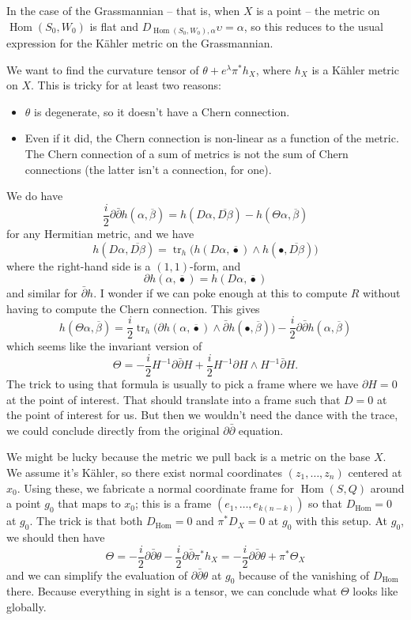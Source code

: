 \documentclass[10pt,a4paper]{article}
\def\ov#1{\overline{#1}}
\DeclareMathOperator{\Hom}{Hom}
\DeclareMathOperator{\tr}{tr}
\begin{document}
In the case of the Grassmannian -- that is, when $X$ is a point -- the metric on $\Hom(S_0,W_0)$ is flat and $D_{\Hom(S_0,W_0),\alpha}\upsilon = \alpha$, so this reduces to the usual expression for the K\"ahler metric on the Grassmannian.

We want to find the curvature tensor of $\theta + e^\lambda \pi^* h_X$, where $h_X$ is a K\"ahler metric on $X$. This is tricky for at least two reasons:
\begin{itemize}
\item $\theta$ is degenerate, so it doesn't have a Chern connection.
\item Even if it did, the Chern connection is non-linear as a function of the metric. The Chern connection of a sum of metrics is not the sum of Chern connections (the latter isn't a connection, for one).
\end{itemize}
We do have
\[
\frac i2 \partial \bar \partial h(\alpha,\ov\beta)
= h(D\alpha, \ov{D\beta}) - h(\Theta \alpha, \ov\beta)
\]
for any Hermitian metric, and we have
\[
h(D\alpha, \ov{D\beta})
= \tr_h \bigl(
h(D\alpha, \ov{\bullet})
\wedge
h(\bullet, \ov{D\beta})
\bigr)
\]
where the right-hand side is a $(1,1)$-form, and
\[
\partial h(\alpha, \ov\bullet)
= h(D\alpha, \ov\bullet)
\]
and similar for $\bar\partial h$. I wonder if we can poke enough at this to compute $R$ without having to compute the Chern connection. This gives
\[
h(\Theta \alpha, \ov\beta)
= \frac i2 \tr_h \big(
\partial h(\alpha, \ov\bullet)
\wedge
\bar\partial h(\bullet, \ov\beta)
\bigr)
- \frac i2 \partial\bar\partial h(\alpha,\ov\beta)
\]
which seems like the invariant version of
\[
\Theta
= - \frac i2 H^{-1} \partial \bar \partial H
+ \frac i2 H^{-1}\partial H \wedge H^{-1} \bar\partial  H.
\]
The trick to using that formula is usually to pick a frame where we have $\partial H = 0$ at the point of interest. That should translate into a frame such that $D = 0$ at the point of interest for us. But then we wouldn't need the dance with the trace, we could conclude directly from the original $\partial\bar\partial$ equation.

We might be lucky because the metric we pull back is a metric on the base $X$. We assume it's K\"ahler, so there exist normal coordinates $(z_1, \ldots, z_n)$ centered at $x_0$. Using these, we fabricate a normal coordinate frame for $\Hom(S,Q)$ around a point $g_0$ that maps to $x_0$; this is a frame $(e_1, \ldots, e_{k(n-k)})$ so that $D_{\Hom} = 0$ at $g_0$. The trick is that both $D_{\Hom} = 0$ and $\pi^*D_X = 0$ at $g_0$ with this setup. At $g_0$, we should then have
\[
\Theta =
-\frac i2 \partial \bar \partial \theta
-\frac i2 \partial \bar \partial \pi^*h_X
= -\frac i2 \partial \bar \partial \theta
+ \pi^*\Theta_X
\]
and we can simplify the evaluation of $\partial \bar \partial \theta$ at $g_0$ because of the vanishing of $D_{\Hom}$ there. Because everything in sight is a tensor, we can conclude what $\Theta$ looks like globally.
\end{document}
